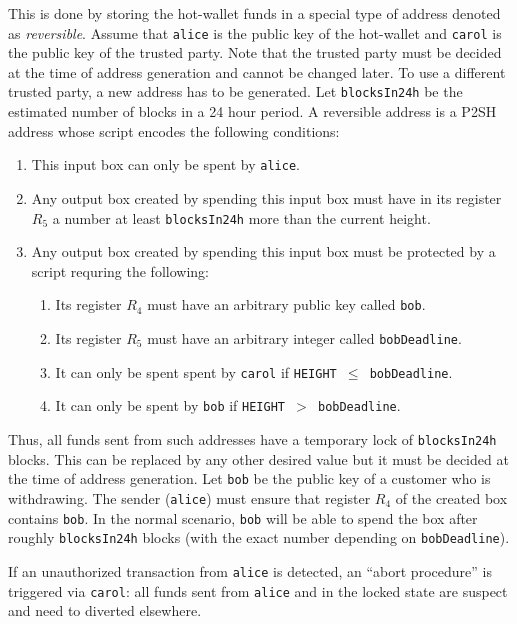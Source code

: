 \documentclass[11pt]{article}
\begin{document}
This is done by storing the hot-wallet funds in a special type of address denoted as {\em reversible}. Assume that \texttt{alice} is the public key of the hot-wallet and \texttt{carol} is the public key of the trusted party. Note that the trusted party must be decided at the time of address generation and cannot be changed later. To use a different trusted party, a new address has to be generated. Let \texttt{blocksIn24h} be the estimated number of blocks in a 24 hour period. A reversible address is a P2SH
address whose script encodes the following conditions:   
\begin{enumerate}
	\item This input box can only be spent by \texttt{alice}.
	\item Any output box created by spending this input box must have in its register $R_5$ a number at least \texttt{blocksIn24h} more than the current height. 
	\item Any output box created by spending this input box must be protected by a script requring the following: 	
	\begin{enumerate}
		\item Its register $R_4$ must have an arbitrary public key called \texttt{bob}.
		\item Its register $R_5$ must have an arbitrary integer called \texttt{bobDeadline}.
		\item It can only be spent spent by \texttt{carol} if \texttt{HEIGHT $\leq$ bobDeadline}.
		\item It can only be spent by \texttt{bob} if \texttt{HEIGHT $>$ bobDeadline}.
	\end{enumerate}  
\end{enumerate}

Thus, all funds sent from such addresses have a temporary lock of \texttt{blocksIn24h} blocks. This can be replaced by any other desired value but it must be decided at the time of address generation. 
Let \texttt{bob} be the public key of a customer who is withdrawing. The sender (\texttt{alice}) must ensure that register $R_4$ of the created box contains \texttt{bob}. In the normal scenario, \texttt{bob} will be able to spend the box after roughly \texttt{blocksIn24h} blocks (with the exact number depending on \texttt{bobDeadline}). 

If an unauthorized transaction from \texttt{alice} is detected, an ``abort procedure'' is triggered via \texttt{carol}: all funds sent from \texttt{alice} and in the locked state are suspect and need to diverted elsewhere. %
\end{document}
